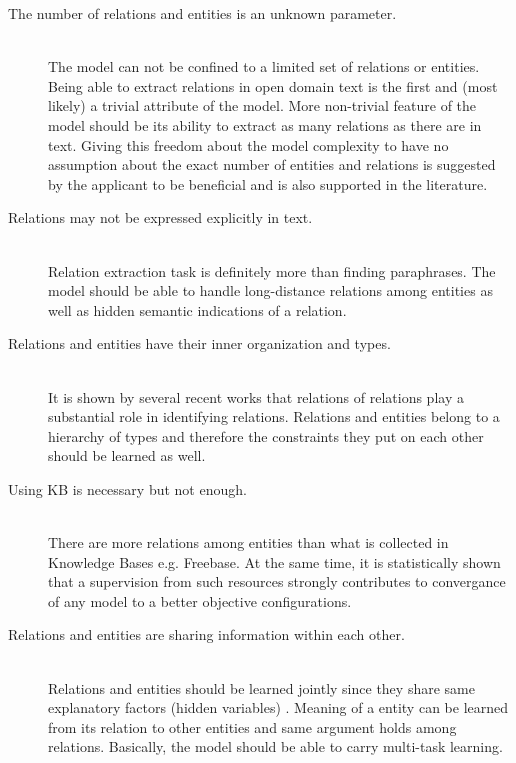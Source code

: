 \documentclass[12pt]{report}
\begin{document}
\begin{description}
  
  \item[The number of relations and entities is an unknown parameter.] \hfill \\
  The model can not be confined to a limited set of relations or entities. Being able to extract relations in
  open domain text is the first and (most likely) a trivial attribute of the model. More non-trivial feature
  of the model should be its ability to extract as many relations as there are in text. 
  Giving this freedom
  about the model complexity to have no assumption about the exact number of entities and relations
  is suggested by the applicant to be beneficial 
   and is also supported in the literature.

  \item[Relations may not be expressed explicitly in text.] \hfill \\
  Relation extraction task is definitely more than finding paraphrases. The model should be able to handle
  long-distance relations among entities as well as hidden semantic indications of a relation.
  

  \item[Relations and entities have their inner organization and types.] \hfill \\
  It is shown by several recent works that relations of relations play a substantial role in identifying
  relations. Relations and entities belong to a hierarchy of types and therefore the constraints they put on each other
  should be learned as well.

  \item[Using KB is necessary but not enough.] \hfill \\
  There are more relations among entities than what is collected in 
  Knowledge Bases e.g. Freebase. At the same time, it is statistically shown that a supervision
  from such resources strongly contributes to convergance of any model to a better 
  objective configurations.

  \item[Relations and entities are sharing information within each other.] \hfill \\
  Relations and entities should be learned jointly since they share same explanatory factors (hidden variables)
  . Meaning of a entity can be learned from its relation to other entities and same argument holds among relations.
  Basically, the model should be able to carry multi-task learning. 
    
\end{description}
\end{document}
